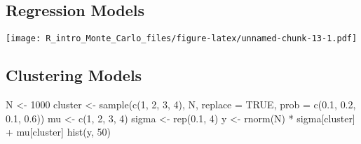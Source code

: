 \documentclass[
]{article}
\newenvironment{Shaded}{\begin{snugshade}}{\end{snugshade}}
\newcommand{\AttributeTok}[1]{\textcolor[rgb]{0.77,0.63,0.00}{#1}}
\newcommand{\ConstantTok}[1]{\textcolor[rgb]{0.00,0.00,0.00}{#1}}
\newcommand{\DecValTok}[1]{\textcolor[rgb]{0.00,0.00,0.81}{#1}}
\newcommand{\FloatTok}[1]{\textcolor[rgb]{0.00,0.00,0.81}{#1}}
\newcommand{\FunctionTok}[1]{\textcolor[rgb]{0.00,0.00,0.00}{#1}}
\newcommand{\NormalTok}[1]{#1}
\newcommand{\OtherTok}[1]{\textcolor[rgb]{0.56,0.35,0.01}{#1}}
\newcommand{\SpecialCharTok}[1]{\textcolor[rgb]{0.00,0.00,0.00}{#1}}
\begin{document}
\hypertarget{regression-models}{%
\subsection{Regression Models}\label{regression-models}}

\begin{Shaded}
\end{Shaded}

\texttt{[image: R\_intro\_Monte\_Carlo\_files/figure-latex/unnamed-chunk-13-1.pdf]}

\hypertarget{clustering-models}{%
\subsection{Clustering Models}\label{clustering-models}}

\begin{Shaded}
\begin{Highlighting}[]
\NormalTok{N }\OtherTok{\textless{}{-}} \DecValTok{1000}
\NormalTok{cluster }\OtherTok{\textless{}{-}} \FunctionTok{sample}\NormalTok{(}\FunctionTok{c}\NormalTok{(}\DecValTok{1}\NormalTok{, }\DecValTok{2}\NormalTok{, }\DecValTok{3}\NormalTok{, }\DecValTok{4}\NormalTok{), N, }\AttributeTok{replace =} \ConstantTok{TRUE}\NormalTok{, }\AttributeTok{prob =} \FunctionTok{c}\NormalTok{(}\FloatTok{0.1}\NormalTok{, }\FloatTok{0.2}\NormalTok{, }\FloatTok{0.1}\NormalTok{, }\FloatTok{0.6}\NormalTok{))}
\NormalTok{mu }\OtherTok{\textless{}{-}} \FunctionTok{c}\NormalTok{(}\DecValTok{1}\NormalTok{, }\DecValTok{2}\NormalTok{, }\DecValTok{3}\NormalTok{, }\DecValTok{4}\NormalTok{)}
\NormalTok{sigma }\OtherTok{\textless{}{-}} \FunctionTok{rep}\NormalTok{(}\FloatTok{0.1}\NormalTok{, }\DecValTok{4}\NormalTok{)}
\NormalTok{y }\OtherTok{\textless{}{-}} \FunctionTok{rnorm}\NormalTok{(N) }\SpecialCharTok{*}\NormalTok{ sigma[cluster] }\SpecialCharTok{+}\NormalTok{ mu[cluster]}
\FunctionTok{hist}\NormalTok{(y, }\DecValTok{50}\NormalTok{)}
\end{Highlighting}
\end{Shaded}
\end{document}

